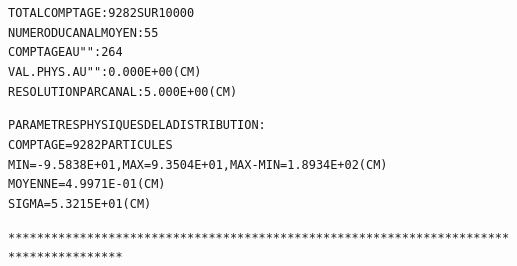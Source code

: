 \begin{alltt}
                TOTAL  COMPTAGE                 :    9282  SUR  10000
                NUMERO   DU  CANAL  MOYEN       :      55
                COMPTAGE  AU   "      "         :     264
                VAL. PHYS. AU  "      "         :  0.000E+00 (CM) 
                RESOLUTION  PAR  CANAL          :  5.000E+00 (CM) 

                PARAMETRES  PHYSIQUES  DE  LA  DISTRIBUTION :
                         COMPTAGE =   9282  PARTICULES
                         MIN= -9.5838E+01, MAX = 9.3504E+01, MAX-MIN = 1.8934E+02 (CM) 
                         MOYENNE =  4.9971E-01 (CM) 
                         SIGMA =  5.3215E+01 (CM) 

**************************************************************************************

\end{alltt}

\newpage

